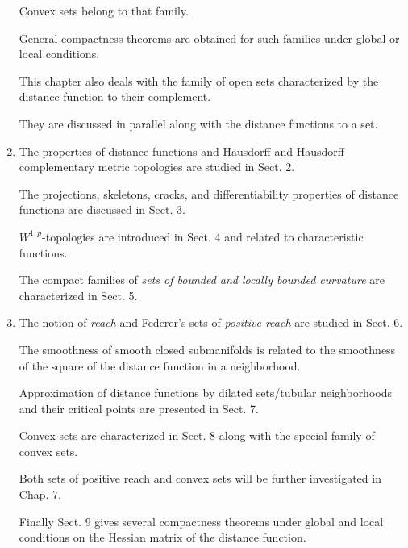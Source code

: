 \documentclass{book}
\numberwithin{equation}{section}
\begin{document}
\begin{enumerate}
    Convex sets belong to that family.
    
    General compactness theorems are obtained for such families under global or local conditions.
    
    This chapter also deals with the family of open sets characterized by the distance function to their complement.
    
    They are discussed in parallel along with the distance functions to a set.
    \item The properties of distance functions and Hausdorff and Hausdorff complementary metric topologies are studied in Sect. 2.
    
    The projections, skeletons, cracks, and differentiability properties of distance functions are discussed in Sect. 3.
    
    $W^{1,p}$-topologies are introduced in Sect. 4 and related to characteristic functions.
    
    The compact families of \textit{sets of bounded and locally bounded curvature} are characterized in Sect. 5.
    \item The notion of \textit{reach} and Federer's sets of \textit{positive reach} are studied in Sect. 6.
    
    The smoothness of smooth closed submanifolds is related to the smoothness of the square of the distance function in a neighborhood.
    
    Approximation of distance functions by dilated sets/tubular neighborhoods and their critical points are presented in Sect. 7.
    
    Convex sets are characterized in Sect. 8 along with the special family of convex sets.
    
    Both sets of positive reach and convex sets will be further investigated in Chap. 7.
    
    Finally Sect. 9 gives several compactness theorems under global and local conditions on the Hessian matrix of the distance function.
\end{enumerate}
\end{document}
